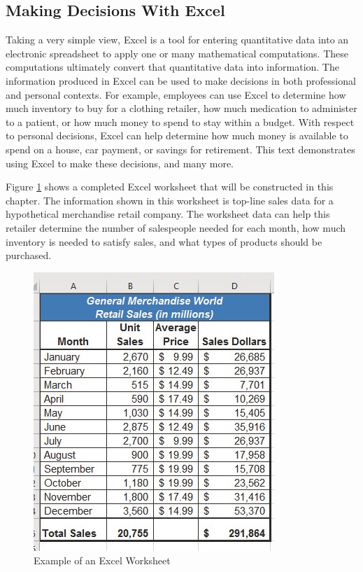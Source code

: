 \subsection{Making Decisions With Excel}

Taking a very simple view, Excel is a tool for entering quantitative data into an electronic spreadsheet to apply one or many mathematical computations. These computations ultimately convert that quantitative data into information. The information produced in Excel can be used to make decisions in both professional and personal contexts. For example, employees can use Excel to determine how much inventory to buy for a clothing retailer, how much medication to administer to a patient, or how much money to spend to stay within a budget. With respect to personal decisions, Excel can help determine how much money is available to spend on a house, car payment, or savings for retirement. This text demonstrates using Excel to make these decisions, and many more.

Figure \ref{01:fig01} shows a completed Excel worksheet that will be constructed in this chapter. The information shown in this worksheet is top-line sales data for a hypothetical merchandise retail company. The worksheet data can help this retailer determine the number of salespeople needed for each month, how much inventory is needed to satisfy sales, and what types of products should be purchased.

\begin{figure}[H]
	\centering
	\includegraphics[width=\maxwidth{.95\linewidth}]{gfx/ch01_fig01}
	\caption{Example of an Excel Worksheet}
	\label{01:fig01}
\end{figure}

